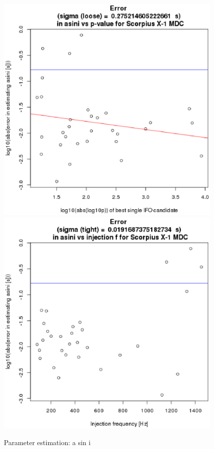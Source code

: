 \begin{figure}
\begin{center}
\includegraphics[width=0.3\paperwidth,height=0.2\paperheight]{ErrorAsini.eps}
\includegraphics[width=0.3\paperwidth,height=0.2\paperheight]{ErrorAsinivsF.eps}
\caption{Parameter estimation: a sin i 
}
\end{center}
\end{figure}



